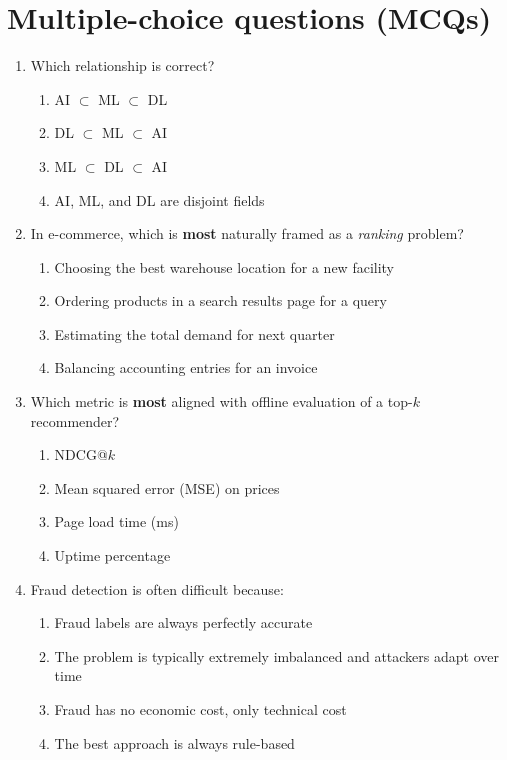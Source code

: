 \section{Multiple-choice questions (MCQs)}
\begin{enumerate}
  \item Which relationship is correct?
  \begin{enumerate}
    \item AI $\subset$ ML $\subset$ DL
    \item DL $\subset$ ML $\subset$ AI
    \item ML $\subset$ DL $\subset$ AI
    \item AI, ML, and DL are disjoint fields
  \end{enumerate}

  \item In e-commerce, which is \textbf{most} naturally framed as a \emph{ranking} problem?
  \begin{enumerate}
    \item Choosing the best warehouse location for a new facility
    \item Ordering products in a search results page for a query
    \item Estimating the total demand for next quarter
    \item Balancing accounting entries for an invoice
  \end{enumerate}

  \item Which metric is \textbf{most} aligned with offline evaluation of a top-$k$ recommender?
  \begin{enumerate}
    \item NDCG@$k$
    \item Mean squared error (MSE) on prices
    \item Page load time (ms)
    \item Uptime percentage
  \end{enumerate}

  \item Fraud detection is often difficult because:
  \begin{enumerate}
    \item Fraud labels are always perfectly accurate
    \item The problem is typically extremely imbalanced and attackers adapt over time
    \item Fraud has no economic cost, only technical cost
    \item The best approach is always rule-based
  \end{enumerate}


\end{enumerate}
